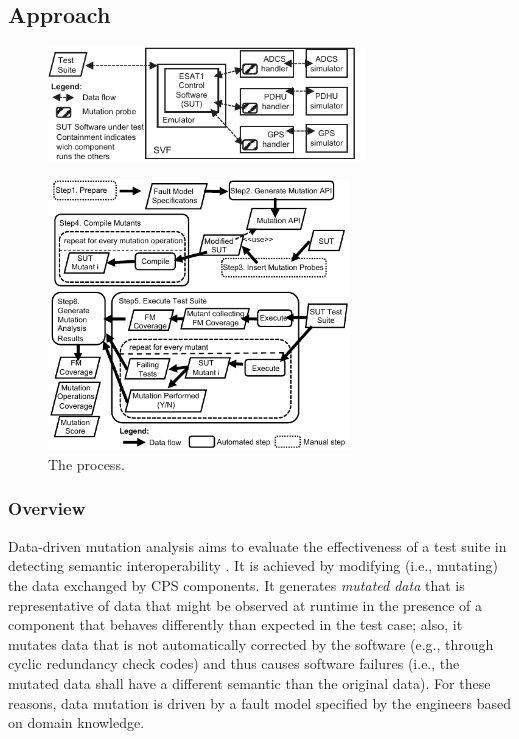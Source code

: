 
\subsection{Approach}

\begin{figure}[tb]
	\centering
		\includegraphics[width=8.4cm]{damat/images/dataMutationExample}
		\caption{}
		\label{fig:appr:mutateProbesInserted}
	\end{figure}

\begin{figure}[tb]
	\centering
		\includegraphics[width=8cm]{damat/images/dataDrivenBufferProcess}
		\caption{The \APPR process.}
		\label{fig:appr:approach}
	\end{figure}

\subsubsection{Overview}


 Data-driven mutation analysis aims to evaluate the effectiveness of a test suite in detecting semantic interoperability . 
It is achieved by modifying (i.e., mutating) the data exchanged by CPS components. It generates \emph{mutated data} that is representative of data that might be observed at runtime in the presence of a component that behaves differently than expected in the test case; also, it mutates  data that is not automatically corrected by the software 
(e.g., through cyclic redundancy check codes)
and thus causes software failures (i.e., the mutated data shall have a different semantic than the original data). For these reasons, data mutation is driven by a fault model specified by the engineers based on domain knowledge.

